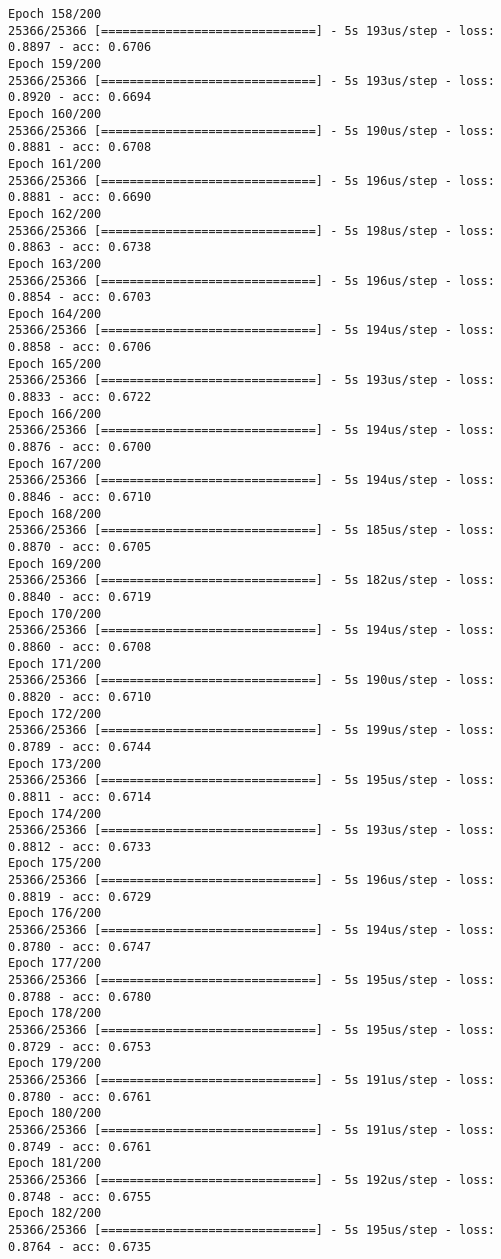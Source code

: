 \documentclass[11pt]{article}
\begin{document}
\begin{Verbatim}[commandchars=\\\{\}]
Epoch 158/200
25366/25366 [==============================] - 5s 193us/step - loss: 0.8897 - acc: 0.6706
Epoch 159/200
25366/25366 [==============================] - 5s 193us/step - loss: 0.8920 - acc: 0.6694
Epoch 160/200
25366/25366 [==============================] - 5s 190us/step - loss: 0.8881 - acc: 0.6708
Epoch 161/200
25366/25366 [==============================] - 5s 196us/step - loss: 0.8881 - acc: 0.6690
Epoch 162/200
25366/25366 [==============================] - 5s 198us/step - loss: 0.8863 - acc: 0.6738
Epoch 163/200
25366/25366 [==============================] - 5s 196us/step - loss: 0.8854 - acc: 0.6703
Epoch 164/200
25366/25366 [==============================] - 5s 194us/step - loss: 0.8858 - acc: 0.6706
Epoch 165/200
25366/25366 [==============================] - 5s 193us/step - loss: 0.8833 - acc: 0.6722
Epoch 166/200
25366/25366 [==============================] - 5s 194us/step - loss: 0.8876 - acc: 0.6700
Epoch 167/200
25366/25366 [==============================] - 5s 194us/step - loss: 0.8846 - acc: 0.6710
Epoch 168/200
25366/25366 [==============================] - 5s 185us/step - loss: 0.8870 - acc: 0.6705
Epoch 169/200
25366/25366 [==============================] - 5s 182us/step - loss: 0.8840 - acc: 0.6719
Epoch 170/200
25366/25366 [==============================] - 5s 194us/step - loss: 0.8860 - acc: 0.6708
Epoch 171/200
25366/25366 [==============================] - 5s 190us/step - loss: 0.8820 - acc: 0.6710
Epoch 172/200
25366/25366 [==============================] - 5s 199us/step - loss: 0.8789 - acc: 0.6744
Epoch 173/200
25366/25366 [==============================] - 5s 195us/step - loss: 0.8811 - acc: 0.6714
Epoch 174/200
25366/25366 [==============================] - 5s 193us/step - loss: 0.8812 - acc: 0.6733
Epoch 175/200
25366/25366 [==============================] - 5s 196us/step - loss: 0.8819 - acc: 0.6729
Epoch 176/200
25366/25366 [==============================] - 5s 194us/step - loss: 0.8780 - acc: 0.6747
Epoch 177/200
25366/25366 [==============================] - 5s 195us/step - loss: 0.8788 - acc: 0.6780
Epoch 178/200
25366/25366 [==============================] - 5s 195us/step - loss: 0.8729 - acc: 0.6753
Epoch 179/200
25366/25366 [==============================] - 5s 191us/step - loss: 0.8780 - acc: 0.6761
Epoch 180/200
25366/25366 [==============================] - 5s 191us/step - loss: 0.8749 - acc: 0.6761
Epoch 181/200
25366/25366 [==============================] - 5s 192us/step - loss: 0.8748 - acc: 0.6755
Epoch 182/200
25366/25366 [==============================] - 5s 195us/step - loss: 0.8764 - acc: 0.6735

\end{Verbatim}
\end{document}
